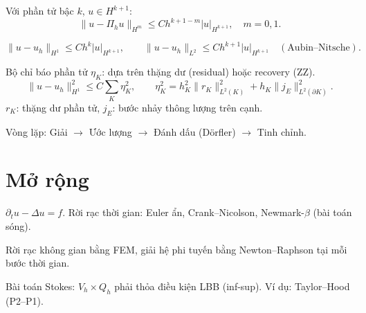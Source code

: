 \documentclass[12pt,a4paper]{article}
\begin{document}
\begin{dinhly}[title={Sai số nội suy}]
  Với phần tử bậc $k$, $u \in H^{k+1}$:
  \[
    \|u - \Pi_h u\|_{H^m} \le Ch^{k+1-m}|u|_{H^{k+1}}, \quad m = 0, 1.
  \]
\end{dinhly}

\begin{dinhly}[title={Ước lượng sai số \textit{a priori}}]
  \[
    \|u - u_h\|_{H^1} \le Ch^k|u|_{H^{k+1}}, \qquad \|u - u_h\|_{L^2} \le Ch^{k+1}|u|_{H^{k+1}} \quad (\text{Aubin--Nitsche}).
  \]
\end{dinhly}

\begin{dinhnghia}[title={Ước lượng sai số \textit{a posteriori}}]
  Bộ chỉ báo phần tử $\eta_K$: dựa trên thặng dư (residual) hoặc recovery (ZZ).
  \[
    \|u - u_h\|_{H^1}^2 \le C\sum_K \eta_K^2, \qquad \eta_K^2 = h_K^2\|r_K\|^2_{L^2(K)} + h_K\|j_E\|^2_{L^2(\partial K)}.
  \]
  $r_K$: thặng dư phần tử, $j_E$: bước nhảy thông lượng trên cạnh.
\end{dinhnghia}

\begin{phuongphap}[title={Tinh chỉnh lưới thích nghi (Adaptive mesh refinement)}]
  Vòng lặp: Giải $\to$ Ước lượng $\to$ Đánh dấu (Dörfler) $\to$ Tinh chỉnh.
\end{phuongphap}

\section{Mở rộng}

\begin{tinhchat}[title={Bài toán phụ thuộc thời gian}]
  $\partial_t u - \Delta u = f$. Rời rạc thời gian: Euler ẩn, Crank--Nicolson, Newmark-$\beta$ (bài toán sóng).
\end{tinhchat}

\begin{tinhchat}[title={Bài toán phi tuyến}]
  Rời rạc không gian bằng FEM, giải hệ phi tuyến bằng Newton--Raphson tại mỗi bước thời gian.
\end{tinhchat}

\begin{tinhchat}[title={Phần tử hỗn hợp (Mixed FEM)}]
  Bài toán Stokes: $V_h \times Q_h$ phải thỏa điều kiện LBB (inf-sup). Ví dụ: Taylor--Hood (P2--P1).
\end{tinhchat}
\end{document}
